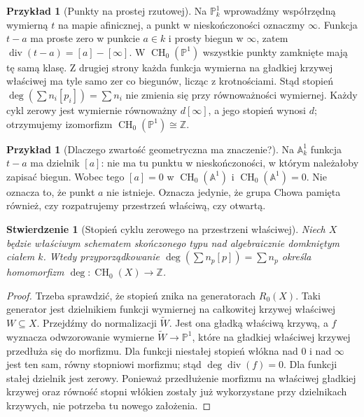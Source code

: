 \documentclass[11pt,a4paper,openany]{report}
\numberwithin{equation}{section}
\theoremstyle{plain}
\newtheorem{stwierdzenie}[twierdzenie]{Stwierdzenie}
\theoremstyle{definition}
\newtheorem{przyklad}[twierdzenie]{Przykład}
\theoremstyle{remark}
\newcommand{\Z}{\mathbb Z}
\newcommand{\A}{\mathbb A}
\newcommand{\PP}{\mathbb P}
\begin{document}
\begin{przyklad}[Punkty na prostej rzutowej]
\label{prz:ga7-p1-points}
Na $\PP^1_k$ wprowadźmy współrzędną wymierną $t$ na
mapie afinicznej, a punkt w nieskończoności oznaczmy
$\infty$. Funkcja $t-a$ ma proste zero w punkcie $a\in k$
i prosty biegun w $\infty$, zatem
$\operatorname{div}(t-a)=[a]-[\infty]$.
W $\operatorname{CH}_0(\PP^1)$ wszystkie punkty zamknięte
mają tę samą klasę. Z drugiej strony każda funkcja wymierna
na gładkiej krzywej właściwej ma tyle samo zer co biegunów,
licząc z krotnościami. Stąd stopień
$\deg(\sum n_i[p_i])=\sum n_i$ nie zmienia się przy
równoważności wymiernej. Każdy cykl zerowy jest wymiernie
równoważny $d[\infty]$, a jego stopień wynosi $d$;
otrzymujemy izomorfizm $\operatorname{CH}_0(\PP^1)\cong\Z$.
\end{przyklad}

\begin{przyklad}[Dlaczego zwartość geometryczna ma znaczenie?]
\label{prz:ga7-a1-chow0}
Na $\A^1_k$ funkcja $t-a$ ma dzielnik $[a]$:
nie ma tu punktu w nieskończoności, w którym należałoby
zapisać biegun. Wobec tego $[a]=0$ w
$\operatorname{CH}_0(\A^1)$ i $\operatorname{CH}_0(\A^1)=0$.
Nie oznacza to, że punkt $a$ nie istnieje. Oznacza jedynie,
że grupa Chowa pamięta również, czy rozpatrujemy przestrzeń
właściwą, czy otwartą.
\end{przyklad}

\begin{stwierdzenie}[Stopień cyklu zerowego na przestrzeni właściwej]
\label{st:ga7-degree}
Niech $X$ będzie właściwym schematem skończonego typu nad
algebraicznie domkniętym ciałem $k$. Wtedy przyporządkowanie
$\deg(\sum n_p[p])=\sum n_p$ określa homomorfizm
$\deg:\operatorname{CH}_0(X)\to\Z$.
\end{stwierdzenie}
\begin{proof}
Trzeba sprawdzić, że stopień znika na generatorach
$R_0(X)$. Taki generator jest dzielnikiem funkcji
wymiernej na całkowitej krzywej właściwej $W\subseteq X$.
Przejdźmy do normalizacji $\widetilde W$.
Jest ona gładką właściwą krzywą, a $f$ wyznacza
odwzorowanie wymierne $\widetilde W\to\PP^1$, które
na gładkiej właściwej krzywej przedłuża się do morfizmu.
Dla funkcji niestałej stopień włókna nad $0$
i nad $\infty$ jest ten sam, równy stopniowi morfizmu;
stąd $\deg\operatorname{div}(f)=0$. Dla funkcji stałej
dzielnik jest zerowy. Ponieważ przedłużenie morfizmu
na właściwej gładkiej krzywej oraz równość stopni włókien
zostały już wykorzystane przy dzielnikach krzywych,
nie potrzeba tu nowego założenia.
\end{proof}
\end{document}
